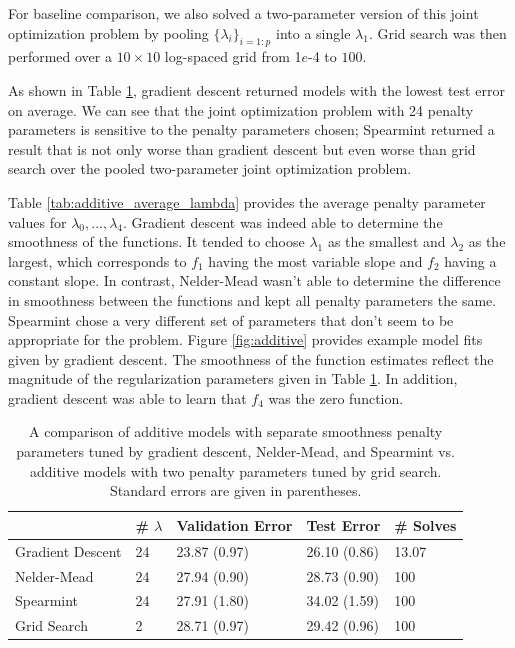 \documentclass[12pt]{article}
\begin{document}
For baseline comparison, we also solved a two-parameter version of this joint optimization problem by pooling $\{\lambda_i\}_{i=1:p}$ into a single $\lambda_1$. Grid search was then performed over a $10 \times 10$ log-spaced grid from 1$e$-4 to $100$. 

As shown in Table \ref{tab:additive}, gradient descent returned models with the lowest test error on average. We can see that the joint optimization problem with 24 penalty parameters is sensitive to the penalty parameters chosen; Spearmint returned a result that is not only worse than gradient descent but even worse than grid search over the pooled two-parameter joint optimization problem.

Table \ref{tab:additive_average_lambda} provides the average penalty parameter values for $\lambda_0, ..., \lambda_4$. Gradient descent was indeed able to determine the smoothness of the functions. It tended to choose $\lambda_1$ as the smallest and $\lambda_2$ as the largest, which corresponds to $f_1$ having the most variable slope and $f_2$ having a constant slope. In contrast, Nelder-Mead wasn't able to determine the difference in smoothness between the functions and kept all penalty parameters the same. Spearmint chose a very different set of parameters that don't seem to be appropriate for the problem. Figure \ref{fig:additive} provides example model fits given by gradient descent. The smoothness of the function estimates reflect the magnitude of the regularization parameters given in Table \ref{tab:additive}. In addition, gradient descent was able to learn that $f_4$ was the zero function.

\begin{table}
\caption {\label{tab:additive} A comparison of additive models with separate smoothness penalty parameters tuned by gradient descent, Nelder-Mead, and Spearmint vs. additive models with two penalty parameters tuned by grid search. Standard errors are given in parentheses.}
\centering
\begin{tabular}{| l | l | l | l | l | }
\hline
& \# $\lambda$ & Validation Error & Test Error & \# Solves\\
\hline
Gradient Descent & 24 & 23.87 (0.97) & 26.10 (0.86) & 13.07 \\
\hline
Nelder-Mead & 24 & 27.94 (0.90) & 28.73 (0.90) & 100 \\
\hline
Spearmint & 24 & 27.91 (1.80) & 34.02 (1.59) & 100 \\
\hline
Grid Search & 2 & 28.71 (0.97) & 29.42 (0.96) & 100 \\
\hline
\end{tabular}
\end{table}
\end{document}

